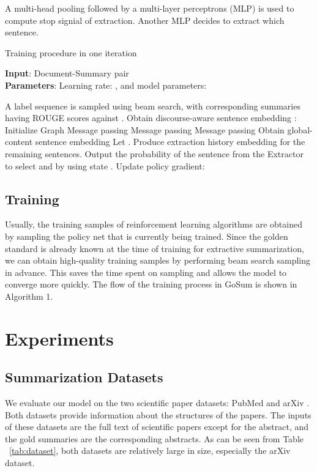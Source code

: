 \documentclass[11pt,a4paper]{article}
\begin{document}
A multi-head pooling followed by a multi-layer perceptrons (MLP) is used to compute stop signial of extraction. Another MLP decides to extract which sentence.





\begin{algorithm}[tb]
\caption{Training procedure in one iteration}
    \label{alg:algorithm}
    \textbf{Input}: Document-Summary pair \\
    \textbf{Parameters}: Learning rate: , and model parameters:  \\
    \begin{algorithmic}[1]
        \STATE A label sequence  is sampled using beam search, with corresponding summaries having ROUGE scores  against .
        \STATE Obtain discourse-aware sentence embedding :
        \STATE \quad Initialize Graph 
        \STATE \quad Message passing 
        \STATE \quad Message passing 
        \STATE \quad Message passing 
        \STATE Obtain global-content sentence embedding 
        \STATE Let .
            \STATE Produce extraction history embedding  for the remaining sentences.
            \STATE Output the probability of the sentence from the Extractor to select  and  by using state .
            \STATE Update policy gradient: 
            \STATE 
        \ENDWHILE
    \end{algorithmic}
\end{algorithm}
 

\subsection{Training}
Usually, the training samples of reinforcement learning algorithms are obtained by sampling the policy net that is currently being trained. Since the golden standard is already known at the time of training for extractive summarization, we can obtain high-quality training samples by performing beam search sampling in advance.
This saves the time spent on sampling and allows the model to converge more quickly.
The flow of the training process in GoSum is shown in Algorithm 1.
%
 
\section{Experiments}
\label{sec:exp}


\subsection{Summarization Datasets}
We evaluate our model on the two scientific paper datasets: PubMed and arXiv  \cite{pubmedarxiv_2018}.
Both datasets provide information about the structures of the papers.
The inputs of these datasets are the full text of scientific papers except for the abstract, and the gold summaries are the corresponding abstracts.
As can be seen from Table ~\ref{tab:dataset}, both datasets are relatively large in size, especially the arXiv dataset.
\end{document}
